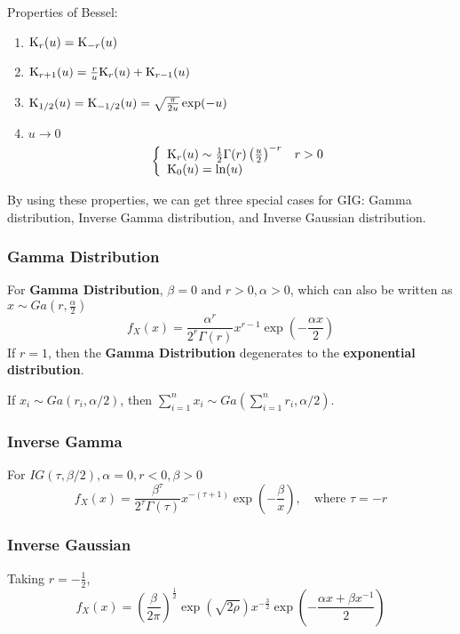 		
		Properties of Bessel:
		\begin{enumerate}[(1)]
			\item $\mathrm{K}_r(u)=\mathrm{K}_{-r}(u)$
			\item $\mathrm{K}_{r+1}(u) = \frac{r}{u}\mathrm{K}_r(u)+ \mathrm{K}_{r-1}(u)$
			\item $\mathrm{K}_{1/2}(u) = \mathrm{K}_{-1/2}(u) = \sqrt{\frac{\pi}{2u}}\exp(-u)$
			\item $u\to 0$
				\begin{eqnarray*}
					\left\{
					\begin{array}{ll}
						\mathrm{K}_r(u)\sim \frac{1}{2}\Gamma(r)\left(\frac{u}{2}\right)^{-r} & r>0 \\
						\mathrm{K}_0(u) = \ln(u)
					\end{array}
					\right.
				\end{eqnarray*}
		\end{enumerate}

	By using these properties, we can get three special cases for GIG: Gamma distribution, Inverse Gamma distribution, and Inverse Gaussian distribution.
	
	
		\subsubsection{Gamma Distribution}	
		For \textbf{Gamma Distribution}, $\beta = 0 \text{ and } r>0, \alpha>0$, which can also be written as $x\sim Ga(r, \frac{\alpha}{2})$
		$$f_X(x) = \frac{\alpha^r}{2^r\Gamma(r)}x^{r-1}\exp\left(-\frac{\alpha x}{2}\right)$$
		If $r=1$, then the \textbf{Gamma Distribution} degenerates to the \textbf{exponential distribution}.
		
		If $x_i\sim Ga(r_i, \alpha/2)$, then $\sum\limits_{i=1}^{n}x_i \sim Ga\left(\sum\limits_{i=1}^{n}r_i, \alpha/2\right)$.
		
		
		\subsubsection{Inverse Gamma}
		For $IG(\tau, \beta/2), \alpha =0, r<0, \beta > 0$
		$$f_X(x) = \frac{\beta^{\tau}}{2^{\tau}\Gamma(\tau)}x^{-(\tau+1)}\exp\left(-\frac{\beta}{x}\right), \quad \text{where }\tau=-r$$ 
		
		\subsubsection{Inverse Gaussian}
		Taking $r = -\frac{1}{2}$,
		$$f_X(x)=\left(\frac{\beta}{2\pi}\right)^{\frac{1}{2}} \exp\left(\sqrt{2\rho}\right)x^{-\frac{3}{2}}\exp\left(-\frac{\alpha x+ \beta x^{-1}}{2}\right)$$
		
